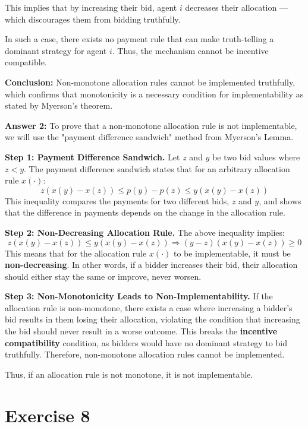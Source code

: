 \documentclass[12pt]{article}
\begin{document}
This implies that by increasing their bid, agent $i$ decreases their allocation — which discourages them from bidding truthfully.

In such a case, there exists no payment rule that can make truth-telling a dominant strategy for agent $i$. Thus, the mechanism cannot be incentive compatible.

\textbf{Conclusion:} Non-monotone allocation rules cannot be implemented truthfully, which confirms that monotonicity is a necessary condition for implementability as stated by Myerson’s theorem.



\textbf{Answer 2:} To prove that a non-monotone allocation rule is not implementable, we will use the "payment difference sandwich" method from Myerson’s Lemma.

\textbf{Step 1: Payment Difference Sandwich.}  
Let \( z \) and \( y \) be two bid values where \( z < y \). The payment difference sandwich states that for an arbitrary allocation rule \( x(\cdot) \):
\[
z(x(y) - x(z)) \leq p(y) - p(z) \leq y(x(y) - x(z))
\]
This inequality compares the payments for two different bids, \( z \) and \( y \), and shows that the difference in payments depends on the change in the allocation rule.

\textbf{Step 2: Non-Decreasing Allocation Rule.}  
The above inequality implies:
\[
z(x(y) - x(z)) \leq y(x(y) - x(z)) \Rightarrow (y - z)(x(y) - x(z)) \geq 0
\]
This means that for the allocation rule \( x(\cdot) \) to be implementable, it must be \textbf{non-decreasing}. In other words, if a bidder increases their bid, their allocation should either stay the same or improve, never worsen.

\textbf{Step 3: Non-Monotonicity Leads to Non-Implementability.}  
If the allocation rule is non-monotone, there exists a case where increasing a bidder’s bid results in them losing their allocation, violating the condition that increasing the bid should never result in a worse outcome. This breaks the \textbf{incentive compatibility} condition, as bidders would have no dominant strategy to bid truthfully. Therefore, non-monotone allocation rules cannot be implemented.

Thus, if an allocation rule is not monotone, it is not implementable.

\section*{Exercise 8}
\end{document}

